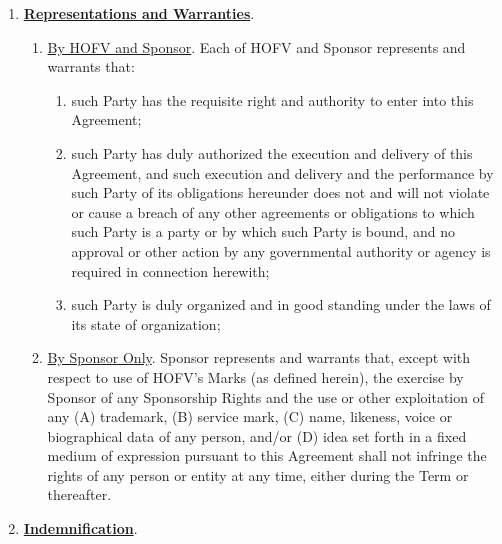 \documentclass[]{article}
\begin{document}
\begin{enumerate}
\def\labelenumi{\arabic{enumi}.}
\setcounter{enumi}{7}
\item
  \textbf{\uline{Representations and Warranties}}.

  \begin{enumerate}
  \def\labelenumii{\arabic{enumii}.}
  \item
    \uline{By HOFV and Sponsor}. Each of HOFV and Sponsor represents and
    warrants that:

    \begin{enumerate}
    \def\labelenumiii{\alph{enumiii}.}
    \item
      such Party has the requisite right and authority to enter into
      this Agreement;
    \item
      such Party has duly authorized the execution and delivery of this
      Agreement, and such execution and delivery and the performance by
      such Party of its obligations hereunder does not and will not
      violate or cause a breach of any other agreements or obligations
      to which such Party is a party or by which such Party is bound,
      and no approval or other action by any governmental authority or
      agency is required in connection herewith;
    \item
      such Party is duly organized and in good standing under the laws
      of its state of organization;
    \end{enumerate}
  \item
    \uline{By Sponsor Only}. Sponsor represents and warrants that,
    except with respect to use of HOFV's Marks (as defined herein), the
    exercise by Sponsor of any Sponsorship Rights and the use or other
    exploitation of any (A) trademark, (B) service mark, (C) name,
    likeness, voice or biographical data of any person, and/or (D) idea
    set forth in a fixed medium of expression pursuant to this Agreement
    shall not infringe the rights of any person or entity at any time,
    either during the Term or thereafter.
  \end{enumerate}
\item
  \textbf{\uline{Indemnification}}.


\end{enumerate}
\end{document}
